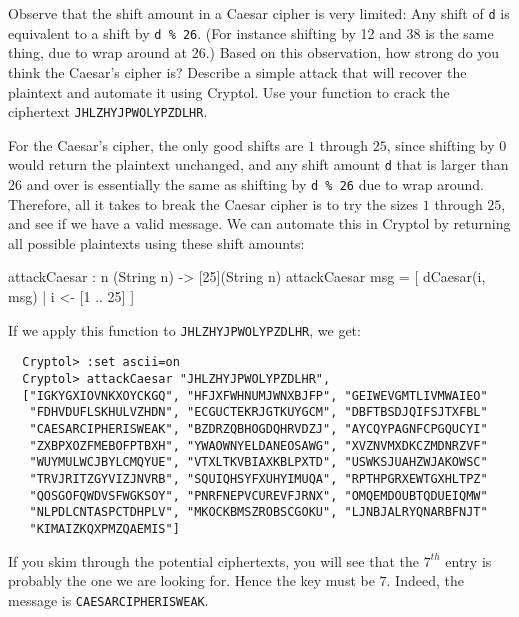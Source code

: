 \begin{Exercise}\label{ex:caesar:3}
  Observe that the shift amount in a Caesar cipher is very limited:
  Any shift of {\tt d} is equivalent to a shift by {\tt d \% 26}. (For
  instance shifting by 12 and 38 is the same thing, due to wrap around
  at 26.) Based on this observation, how strong do you think the
  Caesar's cipher is? Describe a simple attack that will recover the
  plaintext and automate it using Cryptol.  Use your function to crack
  the ciphertext {\tt JHLZHYJPWOLYPZDLHR}.
\end{Exercise}
\begin{Answer}
  For the Caesar's cipher, the only good shifts are $1$ through $25$,
  since shifting by $0$ would return the plaintext unchanged, and any
  shift amount {\tt d} that is larger than $26$ and over is essentially
  the same as shifting by {\tt d \% 26} due to wrap around. Therefore,
  all it takes to break the Caesar cipher is to try the sizes $1$
  through $25$, and see if we have a valid message. We can automate this
  in Cryptol by returning all possible plaintexts using these shift
  amounts:
\begin{code}
  attackCaesar : {n} (String n) -> [25](String n)
  attackCaesar msg = [ dCaesar(i, msg) | i <- [1 .. 25] ]
\end{code}
If we apply this function to {\tt JHLZHYJPWOLYPZDLHR}, we get:
\begin{Verbatim}
  Cryptol> :set ascii=on
  Cryptol> attackCaesar "JHLZHYJPWOLYPZDLHR",
  ["IGKYGXIOVNKXOYCKGQ", "HFJXFWHNUMJWNXBJFP", "GEIWEVGMTLIVMWAIEO"
   "FDHVDUFLSKHULVZHDN", "ECGUCTEKRJGTKUYGCM", "DBFTBSDJQIFSJTXFBL"
   "CAESARCIPHERISWEAK", "BZDRZQBHOGDQHRVDZJ", "AYCQYPAGNFCPGQUCYI"
   "ZXBPXOZFMEBOFPTBXH", "YWAOWNYELDANEOSAWG", "XVZNVMXDKCZMDNRZVF"
   "WUYMULWCJBYLCMQYUE", "VTXLTKVBIAXKBLPXTD", "USWKSJUAHZWJAKOWSC"
   "TRVJRITZGYVIZJNVRB", "SQUIQHSYFXUHYIMUQA", "RPTHPGRXEWTGXHLTPZ"
   "QOSGOFQWDVSFWGKSOY", "PNRFNEPVCUREVFJRNX", "OMQEMDOUBTQDUEIQMW"
   "NLPDLCNTASPCTDHPLV", "MKOCKBMSZROBSCGOKU", "LJNBJALRYQNARBFNJT"
   "KIMAIZKQXPMZQAEMIS"]
\end{Verbatim}
If you skim through the potential ciphertexts, you will see that the
$7^{th}$ entry is probably the one we are looking for. Hence the key
must be $7$.  Indeed, the message is {\tt CAESARCIPHERISWEAK}.
\end{Answer}


